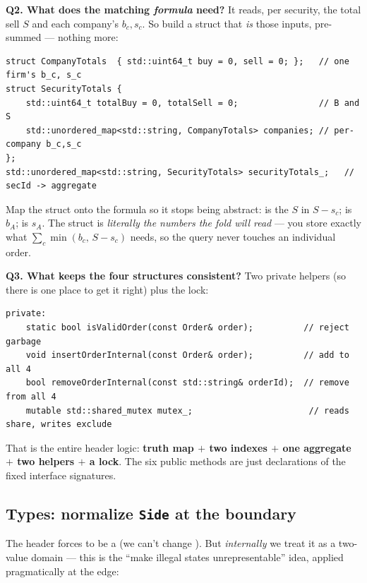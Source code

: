 \textbf{Q2. What does the matching \emph{formula} need?} It reads, per security,
the total sell $S$ and each company's $b_c,s_c$. So build a struct that \emph{is}
those inputs, pre-summed --- nothing more:

\begin{lstlisting}
struct CompanyTotals  { std::uint64_t buy = 0, sell = 0; };   // one firm's b_c, s_c
struct SecurityTotals {
    std::uint64_t totalBuy = 0, totalSell = 0;                // B and S
    std::unordered_map<std::string, CompanyTotals> companies; // per-company b_c,s_c
};
std::unordered_map<std::string, SecurityTotals> securityTotals_;   // secId -> aggregate
\end{lstlisting}

\begin{intu}
Map the struct onto the formula so it stops being abstract:  is
the $S$ in $S-s_c$;  is $b_A$; 
is $s_A$. The struct is \emph{literally the numbers the fold will read} --- you
store exactly what $\sum_c\min(b_c,\,S-s_c)$ needs, so the query never touches an
individual order.
\end{intu}

\textbf{Q3. What keeps the four structures consistent?} Two private helpers (so
there is one place to get it right) plus the lock:

\begin{lstlisting}
private:
    static bool isValidOrder(const Order& order);          // reject garbage
    void insertOrderInternal(const Order& order);          // add to all 4
    bool removeOrderInternal(const std::string& orderId);  // remove from all 4
    mutable std::shared_mutex mutex_;                       // reads share, writes exclude
\end{lstlisting}

That is the entire header logic: \textbf{truth map $+$ two indexes $+$ one
aggregate $+$ two helpers $+$ a lock}. The six public methods are just
 declarations of the fixed interface signatures.

\subsection{Types: normalize \texttt{Side} at the boundary}

The header forces  to be a  (we can't change
). But \emph{internally} we treat it as a two-value domain --- this is
the ``make illegal states unrepresentable'' idea, applied pragmatically at the
edge:

